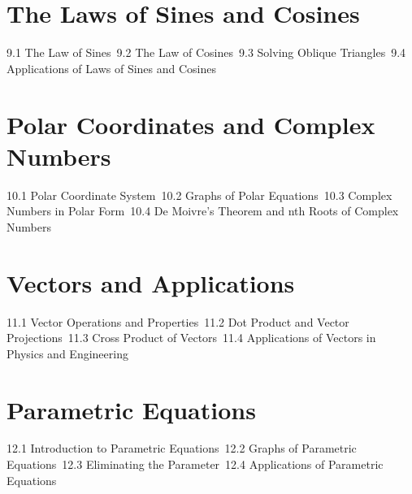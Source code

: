 \section{The Laws of Sines and Cosines}
9.1 The Law of Sines\
9.2 The Law of Cosines\
9.3 Solving Oblique Triangles\
9.4 Applications of Laws of Sines and Cosines\
\section{Polar Coordinates and Complex Numbers}
10.1 Polar Coordinate System\
10.2 Graphs of Polar Equations\
10.3 Complex Numbers in Polar Form\
10.4 De Moivre's Theorem and nth Roots of Complex Numbers\
\section{Vectors and Applications}
11.1 Vector Operations and Properties\
11.2 Dot Product and Vector Projections\
11.3 Cross Product of Vectors\
11.4 Applications of Vectors in Physics and Engineering\
\section{Parametric Equations}
12.1 Introduction to Parametric Equations\
12.2 Graphs of Parametric Equations\
12.3 Eliminating the Parameter\
12.4 Applications of Parametric Equations\
